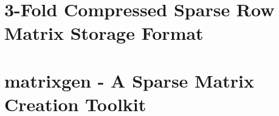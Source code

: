 \documentclass[10pt,usenames,dvipsnames]{report}
\begin{document}
  


  

  \newpage
  \tableofcontents
  \newpage
  \listoffigures

  \part{3-Fold Compressed Sparse Row Matrix Storage Format}

    
    
    
    

  \part{matrixgen - A Sparse Matrix Creation Toolkit}

    
    

  \printbibliography

  \todos
\end{document}
